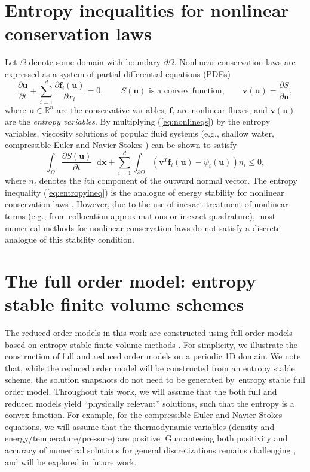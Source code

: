 \documentclass[preprint,10pt]{elsarticle}
\theoremstyle{definition}
\theoremstyle{lemma}
\theoremstyle{theorem}
\theoremstyle{assumption}
\newcommand*\diff[1]{\mathop{}\!{\mathrm{d}#1}}
\newcommand{\pd}[2]{\frac{\partial#1}{\partial#2}}
\newcommand{\LRp}[1]{\left( #1 \right)}
\begin{document}
\section{Entropy inequalities for nonlinear conservation laws}
\label{sec:1}
Let $\Omega$ denote some domain with boundary $\partial \Omega$.  Nonlinear conservation laws are expressed as a system of partial differential equations (PDEs) 
\begin{equation}
\pd{\bm{u}}{t}  + \sum_{i=1}^d\pd{\bm{f}_i(\bm{u})}{x_i} = 0, \qquad 
S(\bm{u}) \text{ is a convex function}, \qquad
\bm{v}(\bm{u}) = \pd{S}{\bm{u}},
\label{eq:nonlineqs}
\end{equation}
where $\bm{u}\in \mathbb{R}^n$ are the conservative variables, $\bm{f}_i$ are nonlinear fluxes, and $\bm{v}(\bm{u})$ are the \textit{entropy variables}.  By multiplying (\ref{eq:nonlineqs}) by the entropy variables, viscosity solutions \cite{oleinik1957discontinuous, kruvzkov1970first}  of popular fluid systems (e.g., shallow water, compressible Euler and Navier-Stokes \cite{hughes1986new, chen2017entropy}) can be shown to satisfy 
\begin{equation}
\int_{\Omega}\pd{S(\bm{u})}{t}\diff{\bm{x}} + \sum_{i=1}^d \int_{\partial \Omega} \LRp{\bm{v}^T\bm{f}_i(\bm{u}) - \psi_i(\bm{u})}n_i \leq 0\label{eq:entropyineq},
\end{equation}
where $n_i$ denotes the $i$th component of the outward normal vector.  
The entropy inequality (\ref{eq:entropyineq}) is the analogue of energy stability for nonlinear conservation laws \cite{mock1980systems, harten1983symmetric}.  
However, due to the use of inexact treatment of nonlinear terms (e.g., from collocation approximations or inexact quadrature), most numerical methods for nonlinear conservation laws do not satisfy a discrete analogue of this stability condition. 

\section{The full order model: entropy stable finite volume schemes}
\label{sec:2}

The reduced order models in this work are constructed using full order models based on entropy stable finite volume methods \cite{tadmor1987numerical}.  For simplicity, we illustrate the construction of full and reduced order models on a periodic 1D domain.  We note that, while the reduced order model will be constructed from an entropy stable scheme, the solution snapshots do not need to be generated by entropy stable full order model.  Throughout this work, we will assume that the both full and reduced models yield ``physically relevant'' solutions, such that the entropy is a convex function.  For example, for the compressible Euler and Navier-Stokes equations, we will assume that the thermodynamic variables (density and energy/temperature/pressure) are positive.  Guaranteeing both positivity and accuracy of numerical solutions for general discretizations remains challenging \cite{guermond2016invariant, guermond2019invariant}, and will be explored in future work.
\end{document}
